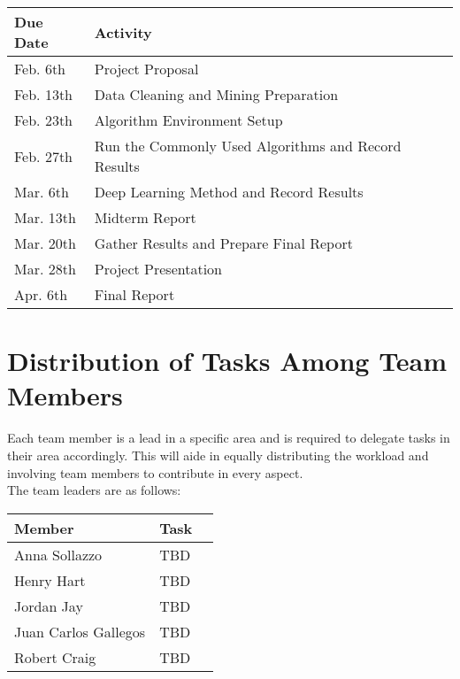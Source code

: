 \documentclass[journal]{IEEEtran}
\begin{document}
\begin{table}[h!]
  \begin{center}
    \label{tab:table1}
    \begin{tabular}{l|l|l|}
      \textbf{Due Date} & \textbf{Activity}\\

      \hline
      Feb. 6th & Project Proposal\\
      Feb. 13th & Data Cleaning and Mining Preparation\\
      Feb. 23th & Algorithm Environment Setup\\
      Feb. 27th & Run the Commonly Used Algorithms and Record Results\\
      Mar. 6th &Deep Learning Method and Record Results\\
      Mar. 13th & Midterm Report\\
      Mar. 20th & Gather Results and Prepare Final Report\\
      Mar. 28th & Project Presentation\\
      Apr. 6th & Final Report\\

    \end{tabular}
  \end{center}
\end{table}


\section{Distribution of Tasks Among Team Members}

Each team member is a lead in a specific area and is required to delegate tasks in their area accordingly. This will aide in equally distributing the workload and involving team members to contribute in every aspect.\\ 

The team leaders are as follows:

\begin{table}[h!]
    \label{tab:table1}
    \begin{tabular}{l|l|l|}
      \textbf{Member} & \textbf{Task}\\

      \hline
	Anna Sollazzo & TBD\\
	Henry Hart & TBD\\
	Jordan Jay & TBD\\
	Juan Carlos Gallegos & TBD\\
	Robert Craig & TBD\\

    \end{tabular}
\end{table}
 
\end{document}

